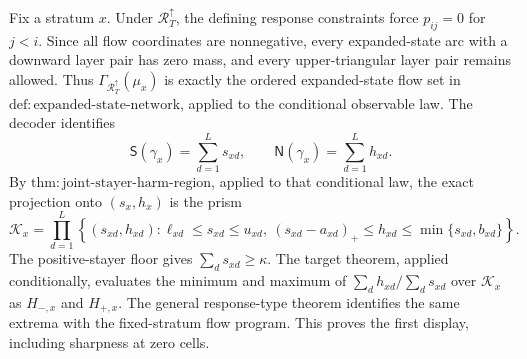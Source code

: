 Fix a stratum \(x\).  Under \(\mathcal R_T^{\uparrow}\), the defining response constraints force \(p_{ij}=0\) for \(j<i\).  Since all flow coordinates are nonnegative, every expanded-state arc with a downward layer pair has zero mass, and every upper-triangular layer pair remains allowed.  Thus \(\Gamma_{\mathcal R_T^{\uparrow}}(\mu_x)\) is exactly the ordered expanded-state flow set in \(\mathrm{def{:}expanded\mbox{-}state\mbox{-}network}\), applied to the conditional observable law.  The decoder identifies
\[\mathsf S(\gamma_x)=\sum_{d=1}^{L}s_{xd},\qquad \mathsf N(\gamma_x)=\sum_{d=1}^{L}h_{xd}.\]
By \(\mathrm{thm{:}joint\mbox{-}stayer\mbox{-}harm\mbox{-}region}\), applied to that conditional law, the exact projection onto \((s_x,h_x)\) is the prism
\[\mathcal K_x=\prod_{d=1}^{L}\left\{(s_{xd},h_{xd}):\ell_{xd}\le s_{xd}\le u_{xd},\ (s_{xd}-a_{xd})_+\le h_{xd}\le\min\{s_{xd},b_{xd}\}\right\}.\]
The positive-stayer floor gives \(\sum_ds_{xd}\ge\kappa\).  The target theorem, applied conditionally, evaluates the minimum and maximum of \(\sum_dh_{xd}/\sum_ds_{xd}\) over \(\mathcal K_x\) as \(H_{-,x}\) and \(H_{+,x}\).  The general response-type theorem identifies the same extrema with the fixed-stratum flow program.  This proves the first display, including sharpness at zero cells.

